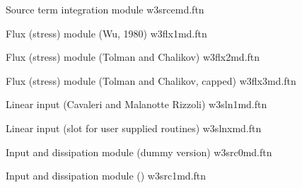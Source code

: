 \vspace{\baselineskip} \noindent
Source term integration module \hfill {\file w3srcemd.ftn}

\begin{flisti}
\end{flisti}

\noindent
Flux (stress) module (Wu, 1980) \hfill {\file w3flx1md.ftn}

\begin{flisti}
\end{flisti}

\noindent
Flux (stress) module (Tolman and Chalikov) \hfill {\file w3flx2md.ftn}

\begin{flisti}
\end{flisti}

\noindent
Flux (stress) module (Tolman and Chalikov, capped) \hfill {\file w3flx3md.ftn}

\begin{flisti}
\end{flisti}

\noindent
Linear input (Cavaleri and Malanotte Rizzoli) \hfill {\file w3sln1md.ftn}

\begin{flisti}
\end{flisti}

\pb \noindent
Linear input (slot for user supplied routines) \hfill {\file w3slnxmd.ftn}

\begin{flisti}
\end{flisti}

\noindent
Input and dissipation module (dummy version) \hfill {\file w3src0md.ftn}

\begin{flisti}
\end{flisti}

\noindent
Input and dissipation module () \hfill {\file w3src1md.ftn}

\begin{flisti}
\end{flisti}

